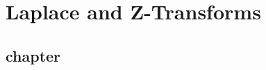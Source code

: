 \documentclass{scrbook}
\begin{document}
\part{Laplace and Z-Transforms}
\chapter{chapter}














\end{document}
